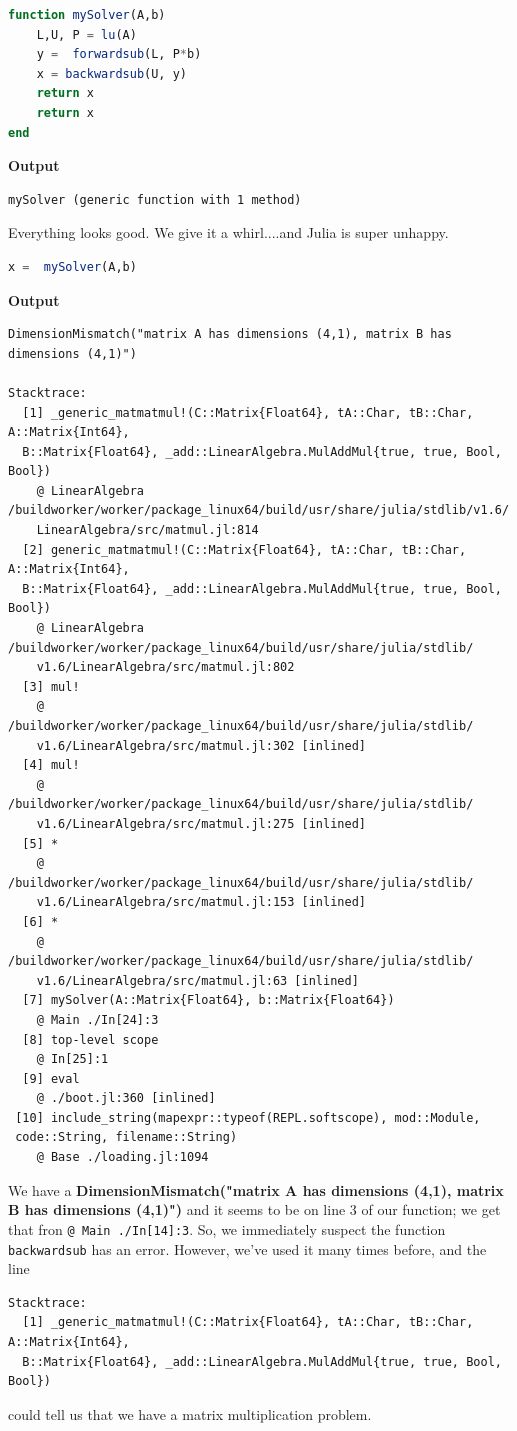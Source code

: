 \begin{lstlisting}[language=Julia,style=mystyle]
function mySolver(A,b)
    L,U, P = lu(A)
    y =  forwardsub(L, P*b)
    x = backwardsub(U, y)
    return x
    return x
end 
\end{lstlisting}
\textbf{Output} 
\begin{verbatim}
mySolver (generic function with 1 method)
\end{verbatim}

Everything looks good. We give it a whirl....and Julia is super unhappy. 

\begin{lstlisting}[language=Julia,style=mystyle]
x =  mySolver(A,b)
\end{lstlisting}
\textbf{Output} 
\begin{verbatim}
DimensionMismatch("matrix A has dimensions (4,1), matrix B has dimensions (4,1)")

Stacktrace:
  [1] _generic_matmatmul!(C::Matrix{Float64}, tA::Char, tB::Char, A::Matrix{Int64},
  B::Matrix{Float64}, _add::LinearAlgebra.MulAddMul{true, true, Bool, Bool})
    @ LinearAlgebra /buildworker/worker/package_linux64/build/usr/share/julia/stdlib/v1.6/
    LinearAlgebra/src/matmul.jl:814
  [2] generic_matmatmul!(C::Matrix{Float64}, tA::Char, tB::Char, A::Matrix{Int64}, 
  B::Matrix{Float64}, _add::LinearAlgebra.MulAddMul{true, true, Bool, Bool})
    @ LinearAlgebra /buildworker/worker/package_linux64/build/usr/share/julia/stdlib/
    v1.6/LinearAlgebra/src/matmul.jl:802
  [3] mul!
    @ /buildworker/worker/package_linux64/build/usr/share/julia/stdlib/
    v1.6/LinearAlgebra/src/matmul.jl:302 [inlined]
  [4] mul!
    @ /buildworker/worker/package_linux64/build/usr/share/julia/stdlib/
    v1.6/LinearAlgebra/src/matmul.jl:275 [inlined]
  [5] *
    @ /buildworker/worker/package_linux64/build/usr/share/julia/stdlib/
    v1.6/LinearAlgebra/src/matmul.jl:153 [inlined]
  [6] *
    @ /buildworker/worker/package_linux64/build/usr/share/julia/stdlib/
    v1.6/LinearAlgebra/src/matmul.jl:63 [inlined]
  [7] mySolver(A::Matrix{Float64}, b::Matrix{Float64})
    @ Main ./In[24]:3
  [8] top-level scope
    @ In[25]:1
  [9] eval
    @ ./boot.jl:360 [inlined]
 [10] include_string(mapexpr::typeof(REPL.softscope), mod::Module, 
 code::String, filename::String)
    @ Base ./loading.jl:1094
\end{verbatim}

We have a \textbf{DimensionMismatch("matrix A has dimensions (4,1), matrix B has dimensions (4,1)")} and it seems to be on line 3 of our function; we get that fron \texttt{@ Main ./In[14]:3}. So, we immediately suspect the function \texttt{backwardsub} has an error. However, we've used it many times before, and the line 
\begin{verbatim}
Stacktrace:
  [1] _generic_matmatmul!(C::Matrix{Float64}, tA::Char, tB::Char, A::Matrix{Int64}, 
  B::Matrix{Float64}, _add::LinearAlgebra.MulAddMul{true, true, Bool, Bool}) 
  \end{verbatim}
could tell us that we have a matrix multiplication problem. \\

